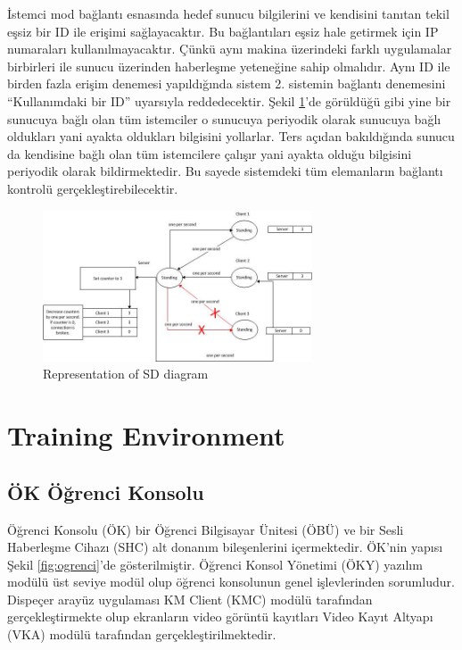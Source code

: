 \documentclass[conference]{IEEEtran}
\begin{document}
İstemci mod bağlantı esnasında hedef sunucu bilgilerini ve kendisini tanıtan tekil eşsiz bir ID ile erişimi sağlayacaktır. Bu bağlantıları eşsiz hale getirmek için IP numaraları kullanılmayacaktır. Çünkü aynı makina üzerindeki farklı uygulamalar birbirleri ile sunucu üzerinden haberleşme yeteneğine sahip olmalıdır. Aynı ID ile birden fazla erişim denemesi yapıldığında sistem 2. sistemin bağlantı denemesini “Kullanımdaki bir ID” uyarsıyla reddedecektir. 
Şekil \ref{fig:SDDiagram}'de görüldüğü gibi yine bir sunucuya bağlı olan tüm istemciler o sunucuya periyodik olarak sunucuya bağlı oldukları yani ayakta oldukları bilgisini yollarlar. Ters açıdan bakıldığında sunucu da kendisine bağlı olan tüm istemcilere çalışır yani ayakta olduğu bilgisini periyodik olarak bildirmektedir. Bu sayede sistemdeki tüm elemanların bağlantı kontrolü gerçekleştirebilecektir. 


\begin{figure}[h!]
  \centering
  \includegraphics[width=8cm]{SDDiagram.jpg}
  \caption{Representation of SD  diagram}\label{fig:SDDiagram}
\end{figure}




\section{Training Environment}

\subsection{ÖK Öğrenci Konsolu}

Öğrenci Konsolu (ÖK) bir Öğrenci Bilgisayar Ünitesi (ÖBÜ) ve bir Sesli Haberleşme Cihazı (SHC) alt donanım bileşenlerini içermektedir. ÖK’nin yapısı Şekil \ref{fig:ogrenci}'de gösterilmiştir.
Öğrenci Konsol Yönetimi (ÖKY) yazılım modülü üst seviye modül olup öğrenci konsolunun genel işlevlerinden sorumludur. Dispeçer arayüz uygulaması KM Client (KMC) modülü tarafından gerçekleştirmekte olup ekranların video görüntü kayıtları Video Kayıt Altyapı (VKA) modülü tarafından gerçekleştirilmektedir.
\end{document}
